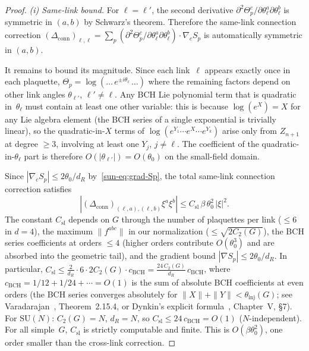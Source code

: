 \documentclass[11pt]{article}
\theoremstyle{definition}
\newcommand{\SU}{\mathrm{SU}}
\begin{document}
\begin{proof}
\emph{(i) Same-link bound.}
For $\ell=\ell'$, the second derivative
$\partial^2\Theta_p^c/\partial\theta_\ell^a
\partial\theta_\ell^b$ is symmetric in $(a,b)$ by
Schwarz's theorem.  Therefore the same-link connection
correction
$(\Delta_{\text{conn}})_{\ell,\ell}
=\sum_p(\partial^2\Theta_p^c/\partial\theta_\ell^a
\partial\theta_\ell^b)\cdot\nabla_c S_p$
is automatically symmetric in $(a,b)$.

It remains to bound its magnitude.  Since each
link~$\ell$ appears exactly once in each plaquette,
$\Theta_p=\log(\ldots\,e^{\pm i\theta_\ell}\,\ldots)$
where the remaining factors depend on other link
angles $\theta_{\ell'}$, $\ell'\ne\ell$.  Any BCH Lie
polynomial term that is quadratic in~$\theta_\ell$ must
contain at least one other variable: this is because
$\log(e^X)=X$ for any Lie algebra element (the BCH
series of a single exponential is trivially linear),
so the quadratic-in-$X$ terms of
$\log(e^{Y_1}\cdots e^X\cdots e^{Y_k})$ arise only from
$Z_{n+1}$ at degree $\ge 3$, involving at least one
$Y_j$, $j\ne\ell$.  The coefficient of the
quadratic-in-$\theta_\ell$ part is therefore
$O(|\theta_{\ell'}|)=O(\theta_0)$ on the small-field
domain.

Since $|\nabla_c S_p|\le 2\theta_0/d_R$
by~\eqref{sun-eq:grad-Sp},
the total
same-link connection correction satisfies
\begin{equation}
|(\Delta_{\text{conn}})_{(\ell,a),(\ell,b)}\xi^a\xi^b|
\le C_{\mathrm{sl}}\,\beta\,\theta_0^2\,|\xi|^2.
\end{equation}
The constant $C_{\mathrm{sl}}$ depends on $G$
through the number of plaquettes per link ($\le 6$ in
$d=4$), the maximum $\|f^{abc}\|$ in our normalization
($\le\sqrt{2C_2(G)}$), the BCH series coefficients
at orders $\le 4$ (higher orders contribute
$O(\theta_0^3)$ and are absorbed into the geometric
tail), and the gradient bound $|\nabla S_p|\le 2\theta_0/d_R$.
In particular,
$C_{\mathrm{sl}}\le \frac{2}{d_R}\cdot 6
\cdot 2C_2(G)\cdot c_{\mathrm{BCH}}
=\frac{24\,C_2(G)}{d_R}\,c_{\mathrm{BCH}}$,
where $c_{\mathrm{BCH}}=1/12+1/24+\cdots=O(1)$ is the
sum of absolute BCH coefficients at even orders
(the BCH series converges absolutely for
$\|X\|+\|Y\|<\theta_{\mathrm{inj}}(G)$;
see Varadarajan~\cite{Varadarajan}, Theorem~2.15.4,
or Dynkin's explicit formula~\cite{Jacobson},
Chapter~V, \S7).
For $\SU(N)$: $C_2(G)=N$, $d_R=N$, so
$C_{\mathrm{sl}}\le 24\,c_{\mathrm{BCH}}=O(1)$
($N$-independent).
For all simple~$G$, $C_{\mathrm{sl}}$ is strictly
computable and finite.
This is $O(\beta\theta_0^2)$, one order smaller than
the cross-link correction.


\end{proof}
\end{document}
